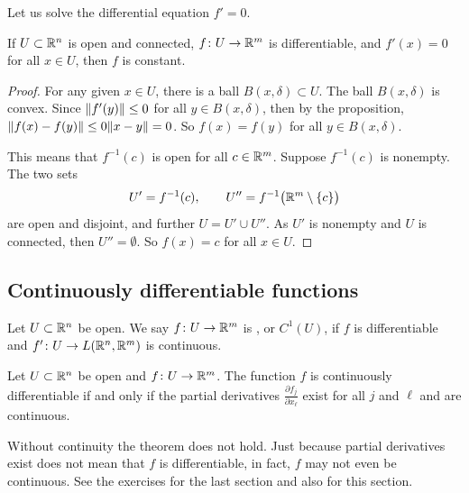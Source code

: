 Let us solve the differential equation $f' = 0$.

\begin{cor}
If $U \subset {\mathbb{R}}^n$ is open and connected, $f \colon U \to {\mathbb{R}}^m$ is
differentiable,
and $f'(x) = 0$ for all $x \in U$, then $f$ is constant.
\end{cor}

\begin{proof}
For any given $x \in U$, there is a ball $B(x,\delta) \subset U$.  The ball
$B(x,\delta)$ is convex.  Since
$\lVert {f'(y)} \rVert \leq 0$ for all $y \in B(x,\delta)$, then by the proposition,
$\lVert {f(x)-f(y)} \rVert \leq 0 \lVert {x-y} \rVert = 0$.  So $f(x) = f(y)$ for all $y \in
B(x,\delta)$.

This means that $f^{-1}(c)$ is open for all $c \in {\mathbb{R}}^m$.  Suppose
$f^{-1}(c)$ is nonempty.  
The two sets
\begin{equation*}
U' = f^{-1}(c), \qquad U'' = f^{-1}\bigl({\mathbb{R}}^m\setminus\{c\}\bigr)
\end{equation*}
are open and disjoint, and further $U = U' \cup U''$.  As $U'$ is nonempty
and $U$ is connected, then
$U'' = \emptyset$.  So $f(x) = c$ for all $x \in U$.
\end{proof}

\subsection{Continuously differentiable functions}

\begin{defn}
Let $U \subset {\mathbb{R}}^n$ be open.
We say $f \colon U \to {\mathbb{R}}^m$ is
\emph{},
or $C^1(U)$,
if $f$ is differentiable and $f' \colon U \to L({\mathbb{R}}^n,{\mathbb{R}}^m)$
is continuous.
\end{defn}

\begin{prop} \label{mv:prop:contdiffpartials}
Let $U \subset {\mathbb{R}}^n$ be open and
$f \colon U \to {\mathbb{R}}^m$.  The function
$f$ is continuously differentiable if and only if 
the partial derivatives $\frac{\partial f_j}{\partial x_\ell}$
exist for all $j$ and $\ell$ and are continuous.
\end{prop}

Without continuity the theorem does not hold.  Just because
partial derivatives exist does not mean that $f$ is differentiable,
in fact, $f$ may not even be continuous.  See the exercises
for the last section and also for this section.

